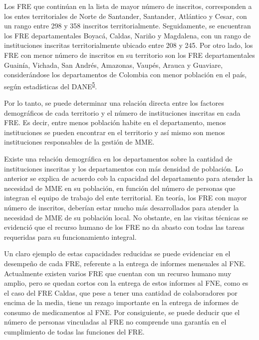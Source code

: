 \documentclass[
]{book}
\begin{document}
Los FRE que continúan en la lista de mayor número de inscritos, corresponden a los entes territoriales de Norte de Santander, Santander, Atlántico y Cesar, con un rango entre 298 y 358 inscritos territorialmente. Seguidamente, se encuentran los FRE departamentales Boyacá, Caldas, Nariño y Magdalena, con un rango de instituciones inscritas territorialmente ubicado entre 208 y 245. Por otro lado, los FRE con menor número de inscritos en su territorio son los FRE departamentales Guainía, Vichada, San Andrés, Amazonas, Vaupés, Arauca y Guaviare, considerándose los departamentos de Colombia con menor población en el país, según estadísticas del DANE\textsuperscript{\protect\hyperlink{ref-DANE2021}{5}}.

Por lo tanto, se puede determinar una relación directa entre los factores demográficos de cada territorio y el número de instituciones inscritas en cada FRE. Es decir, entre menos población habite en el departamento, menos instituciones se pueden encontrar en el territorio y así mismo son menos instituciones responsables de la gestión de MME.

Existe una relación demográfica en los departamentos sobre la cantidad de instituciones inscritas y los departamentos con más densidad de población. Lo anterior se explica de acuerdo cob la capacidad del departamento para atender la necesidad de MME en su población, en función del número de personas que integran el equipo de trabajo del ente territorial. En teoría, los FRE con mayor número de inscritos, deberían estar mucho más desarrollados para atender la necesidad de MME de su población local. No obstante, en las visitas técnicas se evidenció que el recurso humano de los FRE no da abasto con todas las tareas requeridas para su funcionamiento integral.

Un claro ejemplo de estas capacidades reducidas se puede evidenciar en el desempeño de cada FRE, referente a la entrega de informes mensuales al FNE. Actualmente existen varios FRE que cuentan con un recurso humano muy amplio, pero se quedan cortos con la entrega de estos informes al FNE, como es el caso del FRE Caldas, que pese a tener una cantidad de colaboradores por encima de la media, tiene un rezago importante en la entrega de informes de consumo de medicamentos al FNE. Por consiguiente, se puede deducir que el número de personas vinculadas al FRE no comprende una garantía en el cumplimiento de todas las funciones del FRE.
\end{document}
